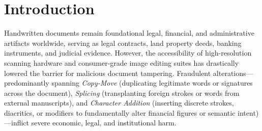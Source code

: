 \documentclass[runningheads]{llncs}
\begin{document}
\begin{abstract}
\end{abstract}

\section{Introduction}\label{sec1}

Handwritten documents remain foundational legal, financial, and administrative artifacts worldwide, serving as legal contracts, land property deeds, banking instruments, and judicial evidence. However, the accessibility of high-resolution scanning hardware and consumer-grade image editing suites has drastically lowered the barrier for malicious document tampering. Fraudulent alterations---predominantly spanning \textit{Copy-Move} (duplicating legitimate words or signatures across the document), \textit{Splicing} (transplanting foreign strokes or words from external manuscripts), and \textit{Character Addition} (inserting discrete strokes, diacritics, or modifiers to fundamentally alter financial figures or semantic intent)---inflict severe economic, legal, and institutional harm.
\end{document}
